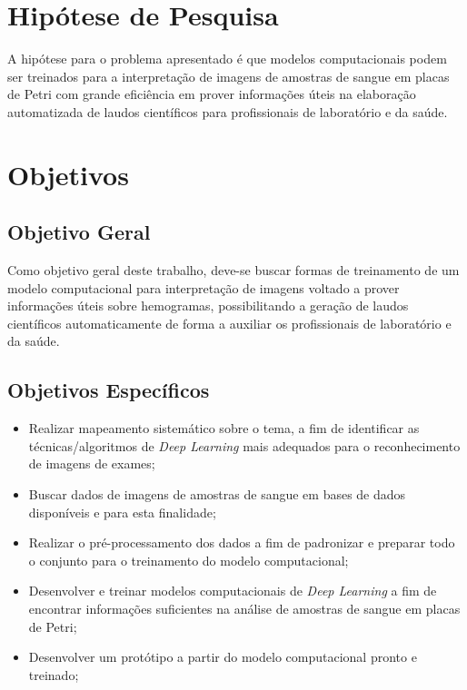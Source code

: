 \section{Hipótese de Pesquisa}
\label{sec:hipotese}

A hipótese para o problema apresentado é que modelos computacionais podem ser treinados para a interpretação de imagens de amostras de sangue em placas de Petri com grande eficiência em prover informações úteis na elaboração automatizada de laudos científicos para profissionais de laboratório e da saúde.


\section{Objetivos}
\label{sec:objetivos}

\subsection{Objetivo Geral}
Como objetivo geral deste trabalho, deve-se buscar formas de treinamento de um modelo computacional para interpretação de imagens voltado a prover informações úteis sobre hemogramas, possibilitando a geração de laudos científicos automaticamente de forma a auxiliar os profissionais de laboratório e da saúde.


\subsection{Objetivos Específicos}
\begin{itemize}
\item Realizar mapeamento sistemático sobre o tema, a fim de identificar as técnicas/algoritmos de \emph{Deep Learning} mais adequados para o reconhecimento de imagens de exames;
\item Buscar dados de imagens de amostras de sangue em bases de dados disponíveis e para esta finalidade;
\item Realizar o pré-processamento dos dados a fim de padronizar e preparar todo o conjunto para o treinamento do modelo computacional;
\item Desenvolver e treinar modelos computacionais de \emph{Deep Learning} a fim de encontrar informações suficientes na análise de amostras de sangue em placas de Petri;
\item Desenvolver um protótipo a partir do modelo computacional pronto e treinado;
\end{itemize}

